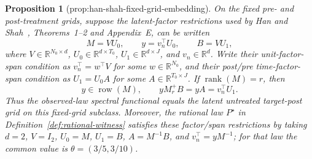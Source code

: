 \documentclass{article}
\newtheorem{proposition}{Proposition}
\begin{document}
\begin{proposition}[prop:han-shah-fixed-grid-embedding]\label{prop:han-shah-fixed-grid-embedding}
On the fixed pre- and post-treatment grids, suppose the latent-factor restrictions used by Han and Shah~\cite{HanShah2025SSC}, Theorems~1--2 and Appendix~E, can be written
\[
 M=VU_0,\qquad y=v_n^\top U_0,\qquad B=VU_1,
\]
where \(V\in\mathbb R^{N_0\times d}\), \(U_0\in\mathbb R^{d\times T_0}\), \(U_1\in\mathbb R^{d\times J}\), and \(v_n\in\mathbb R^d\).  Write their unit-factor-span condition as \(v_n^\top=w^\top V\) for some \(w\in\mathbb R^{N_0}\), and their post/pre time-factor-span condition as \(U_1=U_0A\) for some \(A\in\mathbb R^{T_0\times J}\).  If \(\operatorname{rank}(M)=r\), then
\[
 y\in\operatorname{row}(M),\qquad
 yM_r^+B=yA=v_n^\top U_1.
\]
Thus the observed-law spectral functional equals the latent untreated target-post grid on this fixed-grid subclass.  Moreover, the rational law \(P^\star\) in Definition~\ref{def:rational-witness} satisfies these factor/span restrictions by taking \(d=2\), \(V=I_2\), \(U_0=M\), \(U_1=B\), \(A=M^{-1}B\), and \(v_n^\top=yM^{-1}\); for that law the common value is \(\theta=(3/5,3/10)\).
\end{proposition}
\end{document}
